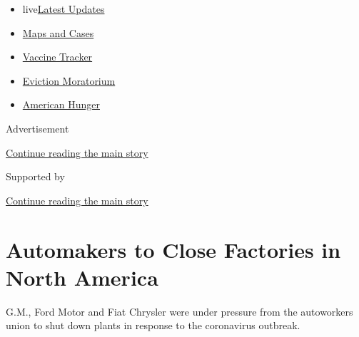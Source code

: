 \begin{itemize}
\tightlist
\item
  live\href{https://www.nytimes3xbfgragh.onion/2020/09/08/world/covid-19-coronavirus.html?name=styln-coronavirus-markets\&region=TOP_BANNER\&block=storyline_menu_recirc\&action=click\&pgtype=Article\&impression_id=4207e121-f1c7-11ea-92a1-2bd7040d46f7\&variant=undefined}{Latest
  Updates}
\item
  \href{https://www.nytimes3xbfgragh.onion/interactive/2020/us/coronavirus-us-cases.html?name=styln-coronavirus-markets\&region=TOP_BANNER\&block=storyline_menu_recirc\&action=click\&pgtype=Article\&impression_id=42080830-f1c7-11ea-92a1-2bd7040d46f7\&variant=undefined}{Maps
  and Cases}
\item
  \href{https://www.nytimes3xbfgragh.onion/interactive/2020/science/coronavirus-vaccine-tracker.html?name=styln-coronavirus-markets\&region=TOP_BANNER\&block=storyline_menu_recirc\&action=click\&pgtype=Article\&impression_id=42080831-f1c7-11ea-92a1-2bd7040d46f7\&variant=undefined}{Vaccine
  Tracker}
\item
  \href{https://www.nytimes3xbfgragh.onion/2020/09/02/your-money/eviction-moratorium-covid.html?name=styln-coronavirus-markets\&region=TOP_BANNER\&block=storyline_menu_recirc\&action=click\&pgtype=Article\&impression_id=42080832-f1c7-11ea-92a1-2bd7040d46f7\&variant=undefined}{Eviction
  Moratorium}
\item
  \href{https://www.nytimes3xbfgragh.onion/interactive/2020/09/02/magazine/food-insecurity-hunger-us.html?name=styln-coronavirus-markets\&region=TOP_BANNER\&block=storyline_menu_recirc\&action=click\&pgtype=Article\&impression_id=42080833-f1c7-11ea-92a1-2bd7040d46f7\&variant=undefined}{American
  Hunger}
\end{itemize}

Advertisement

\protect\hyperlink{after-top}{Continue reading the main story}

Supported by

\protect\hyperlink{after-sponsor}{Continue reading the main story}

\hypertarget{automakers-to-close-factories-in-north-america}{%
\section{Automakers to Close Factories in North
America}\label{automakers-to-close-factories-in-north-america}}

G.M., Ford Motor and Fiat Chrysler were under pressure from the
autoworkers union to shut down plants in response to the coronavirus
outbreak.

